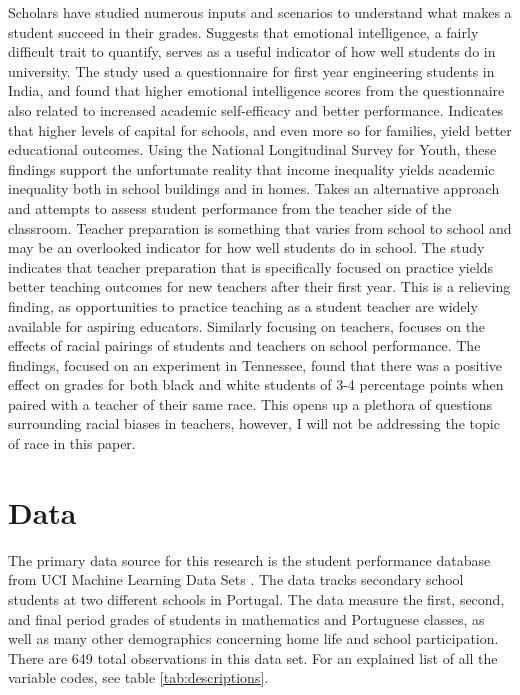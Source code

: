 \documentclass[12pt,english]{article}
\begin{document}
Scholars have studied numerous inputs and scenarios to understand what makes a student succeed in their grades. \citet{emotional} Suggests that emotional intelligence, a fairly difficult trait to quantify, serves as a useful indicator of how well students do in university. The study used a questionnaire for first year engineering students in India, and found that higher emotional intelligence scores from the questionnaire also related to increased academic self-efficacy and better performance. \citet{capital} Indicates that higher levels of capital for schools, and even more so for families, yield better educational outcomes. Using the National Longitudinal Survey for Youth, these findings support the unfortunate reality that income inequality yields academic inequality both in school buildings and in homes. \citet{preparation} Takes an alternative approach and attempts to assess student performance from the teacher side of the classroom. Teacher preparation is something that varies from school to school and may be an overlooked indicator for how well students do in school. The study indicates that teacher preparation that is specifically focused on practice yields better teaching outcomes for new teachers after their first year. This is a relieving finding, as opportunities to practice teaching as a student teacher are widely available for aspiring educators. Similarly focusing on teachers, \citet{race} focuses on the effects of racial pairings of students and teachers on school performance. The findings, focused on an experiment in Tennessee, found that there was a positive effect on grades for both black and white students of 3-4 percentage points when paired with a teacher of their same race. This opens up a plethora of questions surrounding racial biases in teachers, however, I will not be addressing the topic of race in this paper.

\section{Data}\label{sec:data}
The primary data source for this research is the student performance database from UCI Machine Learning Data Sets \citet{cortez_silva_2008}. The data tracks secondary school students at two different schools in Portugal. The data measure the first, second, and final period grades of students in mathematics and Portuguese classes, as well as many other demographics concerning home life and school participation. There are 649 total observations in this data set. For an explained list of all the variable codes, see table \ref{tab:descriptions}.
\end{document}
